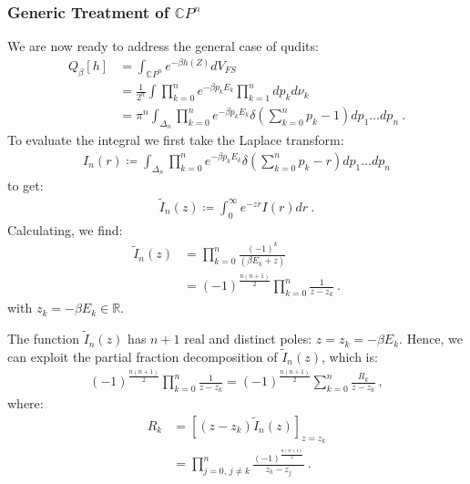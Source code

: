 \documentclass[draft,nofootinbib,pre,twocolumn,showpacs,showkeys,groupaddress,preprintnumbers,floatfix]{revtex4-1}
\newcommand{\1}{\mathbbm{1}}
\begin{document}
\subsubsection{Generic Treatment of $\mathbb{C}P^n$}

We are now ready to address the general case of qudits:
\begin{align*}
Q_\beta[h]
  & = \int_{\mathbb{C}P^n} e^{-\beta h(Z)} dV_{FS} \\
  & = \frac{1}{2^n} \int \prod_{k=0}^n e^{-\beta p_k E_k}
  \prod_{k=1}^n dp_k d\nu_k \\
  & = \pi^n \int_{\Delta_n} \prod_{k=0}^n e^{-\beta p_k E_k}
  \delta \left(\sum_{k=0}^np_k-1\right) dp_1 \ldots dp_n
  ~.
\end{align*}
To evaluate the integral we first take the Laplace transform:
\begin{align*}
I_n(r) \coloneqq \int_{\Delta_n} \prod_{k=0}^n e^{-\beta p_k E_k}
  \delta \left(\sum_{k=0}^np_k-r\right) dp_1 \ldots dp_n
\end{align*}
to get:
\begin{align*}
\tilde{I}_n(z) \coloneqq \int_0^{\infty} e^{-zr}I(r) dr
  ~.
\end{align*}
Calculating, we find:
\begin{align*}
\tilde{I}_n(z)
  & = \prod_{k=0}^n \frac{(-1)^k}{(\beta E_k + z)} \\
  & = (-1)^{\frac{n(n+1)}{2}} \prod_{k=0}^n \frac{1}{z-z_k}
  ~.
\end{align*}
with $z_k = - \beta E_k \in \mathbb{R}$.

The function $\tilde{I}_n(z)$ has $n+1$ real and distinct poles: $z=z_k =
-\beta E_k$. Hence, we can exploit the partial fraction decomposition of
$\tilde{I}_n(z)$, which is:
\begin{align*}
(-1)^{\frac{n(n+1)}{2}} \prod_{k=0}^n \frac{1}{z-z_k}
  = (-1)^{\frac{n(n+1)}{2}} \sum_{k=0}^n \frac{R_k}{z-z_k}
  ~,
\end{align*}
where:
\begin{align*}
R_k & = \left[ (z-z_k)\tilde{I}_n(z)\right]_{z=z_k} \\
  & = \prod_{j=0, \, j \neq k}^n\frac{(-1)^{\frac{n(n+1)}{2}}}{z_k-z_j}
  ~.
\end{align*}
\end{document}
